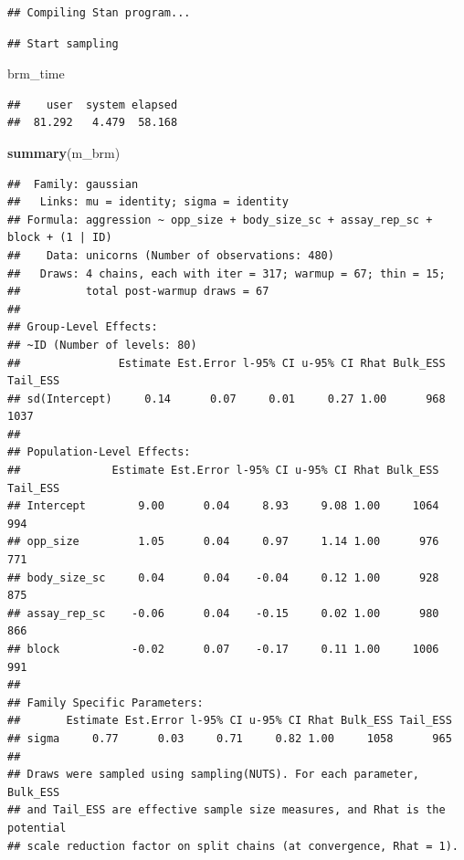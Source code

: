 \documentclass[
  12pt,
]{book}
\newenvironment{Shaded}{\begin{snugshade}}{\end{snugshade}}
\newcommand{\KeywordTok}[1]{\textcolor[rgb]{0.13,0.29,0.53}{\textbf{#1}}}
\newcommand{\NormalTok}[1]{#1}
\begin{document}
\begin{verbatim}
## Compiling Stan program...
\end{verbatim}

\begin{verbatim}
## Start sampling
\end{verbatim}

\begin{Shaded}
\begin{Highlighting}[]
\NormalTok{brm\_time}
\end{Highlighting}
\end{Shaded}

\begin{verbatim}
##    user  system elapsed 
##  81.292   4.479  58.168
\end{verbatim}

\begin{Shaded}
\begin{Highlighting}[]
\KeywordTok{summary}\NormalTok{(m\_brm)}
\end{Highlighting}
\end{Shaded}

\begin{verbatim}
##  Family: gaussian 
##   Links: mu = identity; sigma = identity 
## Formula: aggression ~ opp_size + body_size_sc + assay_rep_sc + block + (1 | ID) 
##    Data: unicorns (Number of observations: 480) 
##   Draws: 4 chains, each with iter = 317; warmup = 67; thin = 15;
##          total post-warmup draws = 67
## 
## Group-Level Effects: 
## ~ID (Number of levels: 80) 
##               Estimate Est.Error l-95% CI u-95% CI Rhat Bulk_ESS Tail_ESS
## sd(Intercept)     0.14      0.07     0.01     0.27 1.00      968     1037
## 
## Population-Level Effects: 
##              Estimate Est.Error l-95% CI u-95% CI Rhat Bulk_ESS Tail_ESS
## Intercept        9.00      0.04     8.93     9.08 1.00     1064      994
## opp_size         1.05      0.04     0.97     1.14 1.00      976      771
## body_size_sc     0.04      0.04    -0.04     0.12 1.00      928      875
## assay_rep_sc    -0.06      0.04    -0.15     0.02 1.00      980      866
## block           -0.02      0.07    -0.17     0.11 1.00     1006      991
## 
## Family Specific Parameters: 
##       Estimate Est.Error l-95% CI u-95% CI Rhat Bulk_ESS Tail_ESS
## sigma     0.77      0.03     0.71     0.82 1.00     1058      965
## 
## Draws were sampled using sampling(NUTS). For each parameter, Bulk_ESS
## and Tail_ESS are effective sample size measures, and Rhat is the potential
## scale reduction factor on split chains (at convergence, Rhat = 1).
\end{verbatim}
\end{document}
